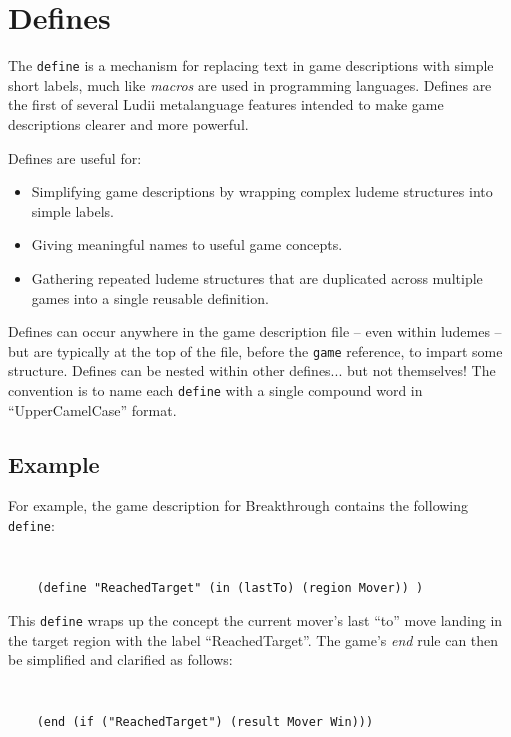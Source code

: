 \chapter{Defines}  \label{Chapter:Defines}

The {\tt define} is a mechanism for replacing text in game descriptions with simple short labels, much like {\it macros} are used in programming languages. 
Defines are the first of several Ludii metalanguage features intended to make game descriptions clearer and more powerful.

\phantom{}
\noindent
Defines are useful for:
\begin{itemize}
\item Simplifying game descriptions by wrapping complex ludeme structures into simple labels.
\item Giving meaningful names to useful game concepts.
\item Gathering repeated ludeme structures that are duplicated across multiple games into a single reusable definition. 
\end{itemize}

\phantom{}
\noindent
Defines can occur anywhere in the game description file -- even within ludemes -- but are typically at the top of the file, before the {\tt game} reference, to impart some structure. 
Defines can be nested within other defines... but not themselves! 
The convention is to name each {\tt define} with a single compound word in ``UpperCamelCase'' format.


\section{Example}

For example, the game description for Breakthrough contains the following {\tt define}:

{\tt
\begin{verbatim}
    (define "ReachedTarget" (in (lastTo) (region Mover)) )
\end{verbatim}
}

This {\tt define} wraps up the concept the current mover's last ``to'' move landing in the target region with the label ``ReachedTarget''. 
The game's {\it end} rule can then be simplified and clarified as follows:

{\tt
\begin{verbatim}
    (end (if ("ReachedTarget") (result Mover Win)))
\end{verbatim}
}

